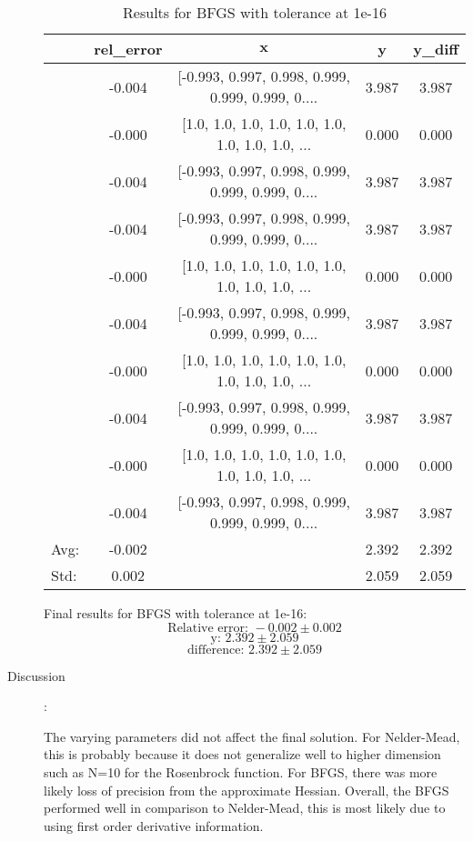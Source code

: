\documentclass[10pt,onside]{article}
\begin{document}
\begin{description}
\begin{table}[ht]
\centering
\caption{Results for BFGS with tolerance at 1e-16}
\begin{tabular}{lcccc}
\toprule
{} &  rel\_error & $\mathbf{x}$ &      y &  y\_diff \\
\midrule
&     -0.004 &  [-0.993, 0.997, 0.998, 0.999, 0.999, 0.999, 0.... &  3.987 &   3.987 \\
&     -0.000 &  [1.0, 1.0, 1.0, 1.0, 1.0, 1.0, 1.0, 1.0, 1.0, ... &  0.000 &   0.000 \\
&     -0.004 &  [-0.993, 0.997, 0.998, 0.999, 0.999, 0.999, 0.... &  3.987 &   3.987 \\
&     -0.004 &  [-0.993, 0.997, 0.998, 0.999, 0.999, 0.999, 0.... &  3.987 &   3.987 \\
&     -0.000 &  [1.0, 1.0, 1.0, 1.0, 1.0, 1.0, 1.0, 1.0, 1.0, ... &  0.000 &   0.000 \\
&     -0.004 &  [-0.993, 0.997, 0.998, 0.999, 0.999, 0.999, 0.... &  3.987 &   3.987 \\
&     -0.000 &  [1.0, 1.0, 1.0, 1.0, 1.0, 1.0, 1.0, 1.0, 1.0, ... &  0.000 &   0.000 \\
&     -0.004 &  [-0.993, 0.997, 0.998, 0.999, 0.999, 0.999, 0.... &  3.987 &   3.987 \\
&     -0.000 &  [1.0, 1.0, 1.0, 1.0, 1.0, 1.0, 1.0, 1.0, 1.0, ... &  0.000 &   0.000 \\
&     -0.004 &  [-0.993, 0.997, 0.998, 0.999, 0.999, 0.999, 0.... &  3.987 &   3.987 \\
\bottomrule
Avg: & -0.002 &  & 2.392 & 2.392 \\
Std: & 0.002 &  & 2.059 & 2.059 \\
\bottomrule
\end{tabular}
\end{table}

Final results for BFGS with tolerance at 1e-16:\\
$$\text{Relative error: } -0.002 \pm 0.002$$
$$\text{y: } 2.392 \pm 2.059$$
$$\text{difference: } 2.392 \pm 2.059$$


\item[Discussion]:

The varying parameters did not affect the final solution. For Nelder-Mead, this is probably because it does not generalize well to higher dimension such as N=10 for the Rosenbrock function. For BFGS, there was more likely loss of precision from the approximate Hessian. Overall, the BFGS performed well in comparison to Nelder-Mead, this is most likely due to using first order derivative information.


\end{description}
\end{document}
